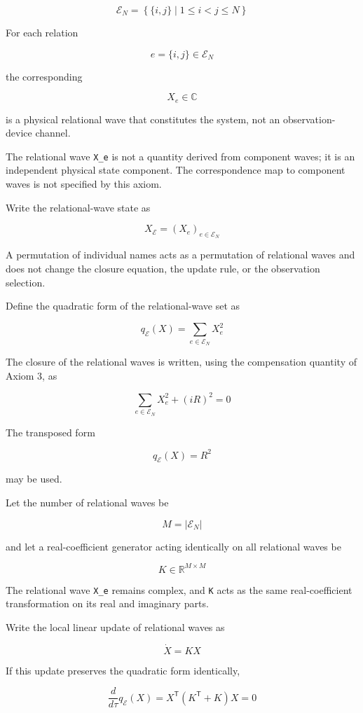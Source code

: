 \documentclass[
  a4paper,
]{article}
\begin{document}
\[
\mathcal E_N
=\left\{\{i,j\}\mid 1\le i<j\le N\right\}
\]

For each relation

\[
e=\{i,j\}\in\mathcal E_N
\]

the corresponding

\[
X_e\in\mathbb C
\]

is a physical relational wave that constitutes the system, not an
observation-device channel.

The relational wave \texttt{X\_e} is not a quantity derived from
component waves; it is an independent physical state component. The
correspondence map to component waves is not specified by this axiom.

Write the relational-wave state as

\[
X_{\mathcal E}
=\left(X_e\right)_{e\in\mathcal E_N}
\]

A permutation of individual names acts as a permutation of relational
waves and does not change the closure equation, the update rule, or the
observation selection.

Define the quadratic form of the relational-wave set as

\[
q_{\mathcal E}(X)
=\sum_{e\in\mathcal E_N}X_e^2
\]

The closure of the relational waves is written, using the compensation
quantity of Axiom 3, as

\[
\sum_{e\in\mathcal E_N}X_e^2+(iR)^2=0
\]

The transposed form

\[
q_{\mathcal E}(X)=R^2
\]

may be used.

Let the number of relational waves be

\[
M=\left|\mathcal E_N\right|
\]

and let a real-coefficient generator acting identically on all
relational waves be

\[
K\in\mathbb R^{M\times M}
\]

The relational wave \texttt{X\_e} remains complex, and \texttt{K} acts
as the same real-coefficient transformation on its real and imaginary
parts.

Write the local linear update of relational waves as

\[
\dot X=KX
\]

If this update preserves the quadratic form identically,

\[
\frac{d}{d\tau}q_{\mathcal E}(X)
=X^{\mathsf T}\left(K^{\mathsf T}+K\right)X
=0
\]
\end{document}
